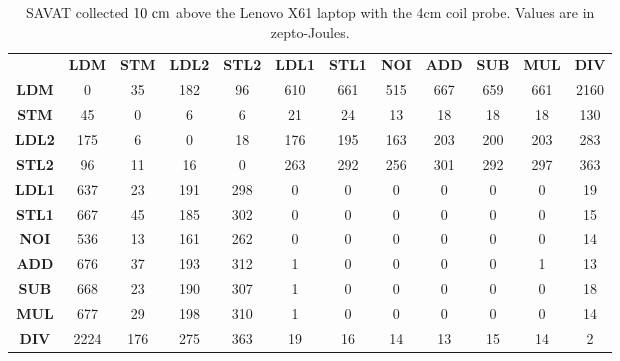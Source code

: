 \begin{table}[htb]
  \scriptsize
  \setlength{\tabcolsep}{2.3pt}
  \setlength\extrarowheight{1pt}
  \caption{SAVAT collected $10~{\rm cm}$ above the Lenovo X61 laptop  with the 4cm coil probe. Values are in zepto-Joules.}
  \begin{tabu}{|c||c|c|c|c|c|c|c|c|c|c|c|} \hline
    & \textbf{LDM} & \textbf{STM} & \textbf{LDL2} & \textbf{STL2} & \textbf{LDL1} & \textbf{STL1} & \textbf{NOI} & \textbf{ADD} & \textbf{SUB} & \textbf{MUL} & \textbf{DIV}
    \\ \hhline{|=||=|=|=|=|=|=|=|=|=|=|=|}
    \textbf{LDM} & {0} & {35} & {182} & {96} & {610} & {661} & {515} & {667} & {659} & {661} & {2160} \\ \hline
    \textbf{STM} & {45} & {0} & {6} & {6} & {21} & {24} & {13} & {18} & {18} & {18} & {130} \\ \hline
    \textbf{LDL2} & {175} & {6} & {0} & {18} & {176} & {195} & {163} & {203} & {200} & {203} & {283} \\ \hline
    \textbf{STL2} & {96} & {11} & {16} & {0} & {263} & {292} & {256} & {301} & {292} & {297} & {363} \\ \hline
    \textbf{LDL1} & {637} & {23} & {191} & {298} & {0} & {0} & {0} & {0} & {0} & {0} & {19} \\ \hline
    \textbf{STL1} & {667} & {45} & {185} & {302} & {0} & {0} & {0} & {0} & {0} & {0} & {15} \\ \hline
    \textbf{NOI} & {536} & {13} & {161} & {262} & {0} & {0} & {0} & {0} & {0} & {0} & {14} \\ \hline
    \textbf{ADD} & {676} & {37} & {193} & {312} & {1} & {0} & {0} & {0} & {0} & {1} & {13} \\ \hline
    \textbf{SUB} & {668} & {23} & {190} & {307} & {1} & {0} & {0} & {0} & {0} & {0} & {18} \\ \hline
    \textbf{MUL} & {677} & {29} & {198} & {310} & {1} & {0} & {0} & {0} & {0} & {0} & {14} \\ \hline
    \textbf{DIV} & {2224} & {176} & {275} & {363} & {19} & {16} &  {14} & {13} & {15} & {14} & {2} \\ \hline
  \end{tabu}

  \label{fig:laptop}
\end{table}


